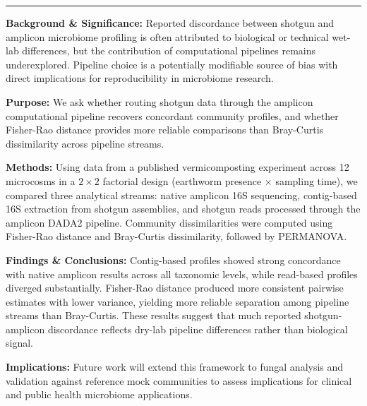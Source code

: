 \documentclass[11pt]{article}
\begin{document}

\vspace{0.4em}
\noindent\rule{\linewidth}{1.5pt}
\vspace{0.2em}


\vspace{0.8em}

\noindent
\begin{minipage}[t]{0.67\linewidth}
\raggedright

\noindent\textbf{Background \& Significance:} Reported discordance between
shotgun and amplicon microbiome profiling is often attributed to biological
or technical wet-lab differences, but the contribution of computational
pipelines remains underexplored. Pipeline choice is a potentially modifiable
source of bias with direct implications for reproducibility in microbiome
research.

\medskip

\noindent\textbf{Purpose:} We ask whether routing shotgun data through the
amplicon computational pipeline recovers concordant community profiles, and
whether Fisher-Rao distance provides more reliable comparisons than
Bray-Curtis dissimilarity across pipeline streams.

\medskip

\noindent\textbf{Methods:} Using data from a published vermicomposting
experiment across 12 microcosms in a $2{\times}2$ factorial design
(earthworm presence $\times$ sampling time), we compared three analytical
streams: native amplicon 16S sequencing, contig-based 16S extraction from
shotgun assemblies, and shotgun reads processed through the amplicon DADA2
pipeline. Community dissimilarities were computed using Fisher-Rao distance
and Bray-Curtis dissimilarity, followed by PERMANOVA\@.

\medskip

\noindent\textbf{Findings \& Conclusions:} Contig-based profiles showed
strong concordance with native amplicon results across all taxonomic levels,
while read-based profiles diverged substantially. Fisher-Rao distance
produced more consistent pairwise estimates with lower variance, yielding
more reliable separation among pipeline streams than Bray-Curtis.
These results suggest that much reported shotgun-amplicon discordance
reflects dry-lab pipeline differences rather than biological signal.

\medskip

\noindent\textbf{Implications:} Future work will extend this framework to
fungal analysis and validation against reference mock communities to assess
implications for clinical and public health microbiome applications.

\end{minipage}
\end{document}
